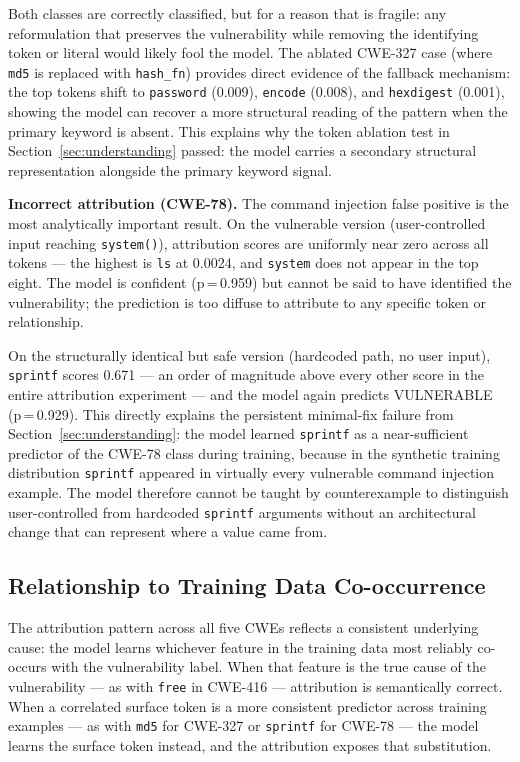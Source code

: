 Both classes are correctly classified, but for a reason that is fragile: any reformulation
that preserves the vulnerability while removing the identifying token or literal would
likely fool the model.
The ablated CWE-327 case (where \texttt{md5} is replaced with \texttt{hash\_fn})
provides direct evidence of the fallback mechanism: the top tokens shift to
\texttt{password} (0.009), \texttt{encode} (0.008), and \texttt{hexdigest} (0.001),
showing the model can recover a more structural reading of the pattern when the primary
keyword is absent.
This explains why the token ablation test in Section~\ref{sec:understanding} passed:
the model carries a secondary structural representation alongside the primary keyword signal.

\textbf{Incorrect attribution (CWE-78).}
The command injection false positive is the most analytically important result.
On the vulnerable version (user-controlled input reaching \texttt{system()}), attribution
scores are uniformly near zero across all tokens --- the highest is \texttt{ls} at 0.0024,
and \texttt{system} does not appear in the top eight.
The model is confident (p\,=\,0.959) but cannot be said to have identified the
vulnerability; the prediction is too diffuse to attribute to any specific token or
relationship.

On the structurally identical but safe version (hardcoded path, no user input),
\texttt{sprintf} scores 0.671 --- an order of magnitude above every other score
in the entire attribution experiment --- and the model again predicts VULNERABLE (p\,=\,0.929).
This directly explains the persistent minimal-fix failure from Section~\ref{sec:understanding}:
the model learned \texttt{sprintf} as a near-sufficient predictor of the CWE-78 class
during training, because in the synthetic training distribution \texttt{sprintf} appeared
in virtually every vulnerable command injection example.
The model therefore cannot be taught by counterexample to distinguish user-controlled from
hardcoded \texttt{sprintf} arguments without an architectural change that can represent
where a value came from.

\subsection{Relationship to Training Data Co-occurrence}

The attribution pattern across all five CWEs reflects a consistent underlying cause:
the model learns whichever feature in the training data most reliably co-occurs with
the vulnerability label.
When that feature is the true cause of the vulnerability --- as with \texttt{free} in
CWE-416 --- attribution is semantically correct.
When a correlated surface token is a more consistent predictor across training examples
--- as with \texttt{md5} for CWE-327 or \texttt{sprintf} for CWE-78 --- the model
learns the surface token instead, and the attribution exposes that substitution.

